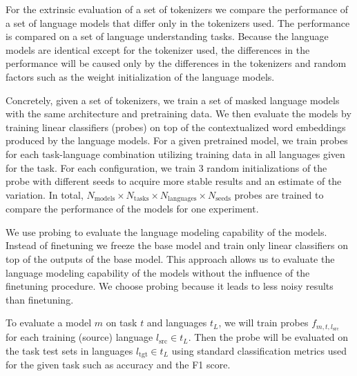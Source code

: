 For the extrinsic evaluation of a set of tokenizers we compare the performance of a set of language models that differ only in the tokenizers used. The performance is compared on a set of language understanding tasks.
Because the language models are identical except for the tokenizer used, the differences in the performance will be caused only by the differences in the tokenizers and random factors such as the weight initialization of the language models.

Concretely, given a set of tokenizers, we train a set of masked language models with the same architecture and pretraining data. We then evaluate the models by training linear classifiers (probes) on top of the contextualized word embeddings produced by the language models. For a given pretrained model, we train probes for each task-language combination utilizing training data in all languages given for the task. For each configuration, we train 3 random initializations of the probe with different seeds to acquire more stable results and an estimate of the variation. In total, $N_\mathrm{models} \times N_\mathrm{tasks} \times N_\mathrm{languages} \times N_\mathrm{seeds}$ probes are trained to compare the performance of the models for one experiment.

We use probing \cite{conneau_what_2018,belinkov_interpretability_2020,blevins_analyzing_2022} to evaluate the language modeling capability of the models. Instead of finetuning we freeze the base model and train only linear classifiers on top of the outputs of the base model. This approach allows us to evaluate the language modeling capability of the models without the influence of the finetuning procedure. We choose probing because it leads to less noisy results than finetuning. 


To evaluate a model $m$ on task $t$ and languages $t_L$, we will train probes $f_{m, t, l_\mathrm{src}}$ for each training (source) language $l_\mathrm{src} \in t_L$. Then the probe will be evaluated on the task test sets in languages $l_\mathrm{tgt} \in t_L$ using standard classification metrics used for the given task such as accuracy and the F1 score.


